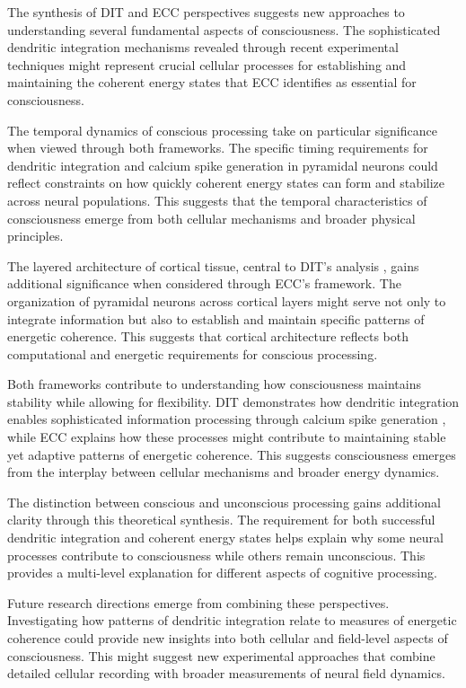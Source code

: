 The synthesis of DIT and ECC perspectives suggests new approaches to understanding several fundamental aspects of consciousness. The sophisticated dendritic integration mechanisms revealed through recent experimental techniques \cite{Suzuki2021} might represent crucial cellular processes for establishing and maintaining the coherent energy states that ECC identifies as essential for consciousness.

The temporal dynamics of conscious processing take on particular significance when viewed through both frameworks. The specific timing requirements for dendritic integration and calcium spike generation in pyramidal neurons could reflect constraints on how quickly coherent energy states can form and stabilize across neural populations. This suggests that the temporal characteristics of consciousness emerge from both cellular mechanisms and broader physical principles.

The layered architecture of cortical tissue, central to DIT's analysis \cite{Larkum2013}, gains additional significance when considered through ECC's framework. The organization of pyramidal neurons across cortical layers might serve not only to integrate information but also to establish and maintain specific patterns of energetic coherence. This suggests that cortical architecture reflects both computational and energetic requirements for conscious processing.

Both frameworks contribute to understanding how consciousness maintains stability while allowing for flexibility. DIT demonstrates how dendritic integration enables sophisticated information processing through calcium spike generation \cite{Major2013}, while ECC explains how these processes might contribute to maintaining stable yet adaptive patterns of energetic coherence. This suggests consciousness emerges from the interplay between cellular mechanisms and broader energy dynamics.

The distinction between conscious and unconscious processing gains additional clarity through this theoretical synthesis. The requirement for both successful dendritic integration and coherent energy states helps explain why some neural processes contribute to consciousness while others remain unconscious. This provides a multi-level explanation for different aspects of cognitive processing.

Future research directions emerge from combining these perspectives. Investigating how patterns of dendritic integration relate to measures of energetic coherence could provide new insights into both cellular and field-level aspects of consciousness. This might suggest new experimental approaches that combine detailed cellular recording with broader measurements of neural field dynamics.

